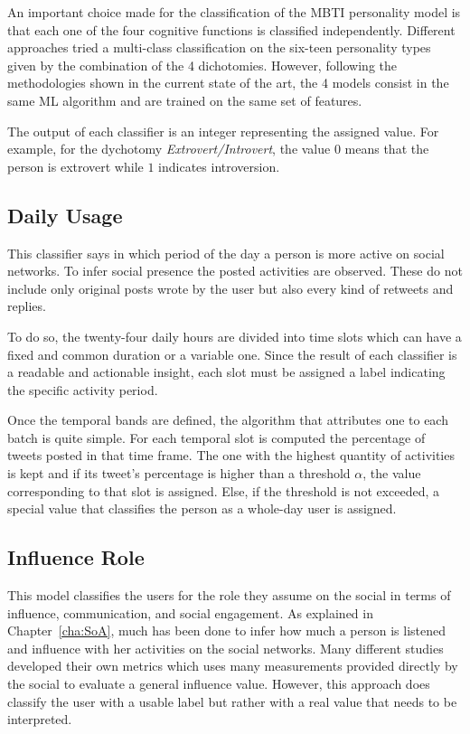 An important choice made for the classification of the MBTI personality model is that each one of the four cognitive functions is classified independently.
Different approaches tried a multi-class classification on the six-teen personality types given by the combination of the 4 dichotomies.
However, following the methodologies shown in the current state of the art, the 4 models consist in the same ML algorithm and are trained on the same set of features.

The output of each classifier is an integer representing the assigned value. For example, for the dychotomy \textit{Extrovert/Introvert}, the value $0$ means that the person is extrovert while $1$ indicates introversion.

\subsection{Daily Usage}
This classifier says in which period of the day a person is more active on social networks.
To infer social presence the posted activities are observed. These do not include only original posts wrote by the user but also every kind of retweets and replies.

To do so, the twenty-four daily hours are divided into time slots which can have a fixed and common duration or a variable one.
Since the result of each classifier is a readable and actionable insight, each slot must be assigned a label indicating the specific activity period.

Once the temporal bands are defined, the algorithm  that attributes one to each batch is quite simple.
For each temporal slot is computed the percentage of tweets posted in that time frame.
The one with the highest quantity of activities is kept and if its tweet's percentage is higher than a threshold $\alpha$, the value corresponding to that slot is assigned.
Else, if the threshold is not exceeded, a special value that classifies the person as a whole-day user is assigned.

\subsection{Influence Role}
This model classifies the users for the role they assume on the social in terms of influence, communication, and social engagement.
As explained in Chapter~\ref{cha:SoA}, much has been done to infer how much a person is listened and influence with her activities on the social networks.
Many different studies developed their own metrics which uses many measurements provided directly by the social to evaluate a general influence value.
However, this approach does classify the user with a usable label but rather with a real value that needs to be interpreted.

